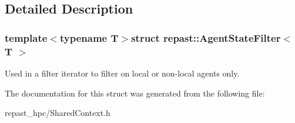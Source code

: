 \subsection{Detailed Description}
\subsubsection*{template$<$typename T$>$struct repast\-::\-Agent\-State\-Filter$<$ T $>$}

Used in a filter iterator to filter on local or non-\/local agents only. 

The documentation for this struct was generated from the following file\-:\begin{DoxyCompactItemize}
\item 
repast\-\_\-hpc/Shared\-Context.\-h\end{DoxyCompactItemize}
